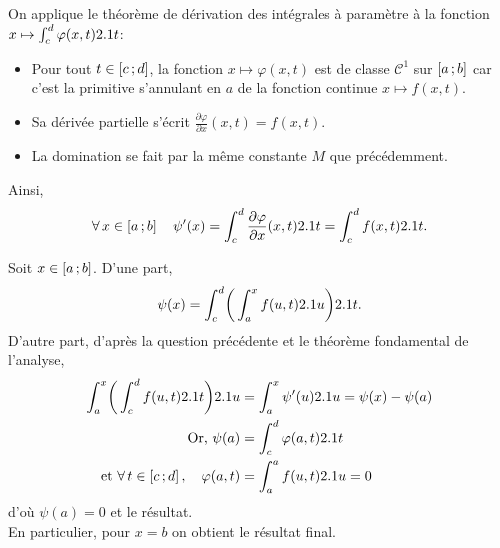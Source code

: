 \begin{solution}
\begin{reponses}
\item On applique le théorème de dérivation des intégrales à paramètre à la fonction $x \mapsto \int_{c}^{d} \varphi(x, t) 2.1 t$:
        \begin{itemize}
            \item Pour tout $t \in \left[c\,;d\right]$, la fonction $x \mapsto \varphi(x, t)$ est de classe $\mathscr{C}^1$ sur $\left[a\,;b\right]$ car c'est la primitive s'annulant en $a$ de la fonction continue $x \mapsto f(x, t)$. 
            \item Sa dérivée partielle s'écrit $\frac{\partial \varphi}{\partial x}(x, t) = f(x, t)$.
            \item La domination se fait par la même constante $M$ que précédemment. 
            \end{itemize}
            Ainsi,
            \[
            \forall x \in \interff{a}{b} \quad \psi'(x) = \int_c^d \frac{\partial \varphi}{\partial x}(x, t) \d t = \int_{c}^{d} f(x, t) \d t.
            \]
        \item Soit $x \in \left[a\,;b\right]$. D'une part,
        $$\psi(x) = \int_{c}^{d} \mathopen{}\bigg( \int_{a}^{x} f(u,t) 2.1 u \bigg) 2.1 t.$$
        D'autre part, d'après la question précédente et le théorème fondamental de l'analyse, 
        \begin{align*}
            \int_{a}^{x} \mathopen{}\bigg( \int_{c}^{d} f(u,t) \d t \bigg) \d u &= \int_{a}^{x} \psi'(u) \d u  = \psi(x) - \psi(a) \\
            \text{Or, } \psi(a) &= \int_{c}^{d} \varphi(a, t) \d t \\
            \text{et } \forall t \in \interff{c}{d}, \quad \varphi(a, t) &= \int_{a}^{a} f(u, t) \d u = 0
        \end{align*}
        d'où $\psi(a) = 0$ et le résultat. \\
        En particulier, pour $x = b$ on obtient le résultat final.
    \end{reponses}
\end{solution}    



